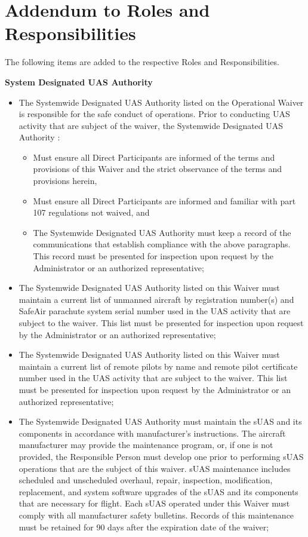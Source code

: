 \documentclass[
]{book}
\providecommand{\tightlist}{%
  \setlength{\itemsep}{0pt}\setlength{\parskip}{0pt}}
\begin{document}
\section{Addendum to Roles and Responsibilities}\label{s39p-rr}

The following items are added to the respective Roles and Responsibilities.

\textbf{System Designated UAS Authority}

\begin{itemize}
\item
  The Systemwide Designated UAS Authority listed on the Operational Waiver is responsible for the safe conduct of operations. Prior to conducting UAS activity that are subject of the waiver, the Systemwide Designated UAS Authority :

  \begin{itemize}
  \tightlist
  \item
    Must ensure all Direct Participants are informed of the terms and provisions of this Waiver and the strict observance of the terms and provisions herein,
  \item
    Must ensure all Direct Participants are informed and familiar with part 107 regulations not waived, and
  \item
    The Systemwide Designated UAS Authority must keep a record of the communications that establish compliance with the above paragraphs. This record must be presented for inspection upon request by the Administrator or an authorized representative;
  \end{itemize}
\item
  The Systemwide Designated UAS Authority listed on this Waiver must maintain a current list of unmanned aircraft by registration number(s) and SafeAir parachute system serial number used in the UAS activity that are subject to the waiver. This list must be presented for inspection upon request by the Administrator or an authorized representative;
\item
  The Systemwide Designated UAS Authority listed on this Waiver must maintain a current list of remote pilots by name and remote pilot certificate number used in the UAS activity that are subject to the waiver. This list must be presented for inspection upon request by the Administrator or an authorized representative;
\item
  The Systemwide Designated UAS Authority must maintain the sUAS and its components in accordance with manufacturer's instructions. The aircraft manufacturer may provide the maintenance program, or, if one is not provided, the Responsible Person must develop one prior to performing sUAS operations that are the subject of this waiver. sUAS maintenance includes scheduled and unscheduled overhaul, repair, inspection, modification, replacement, and system software upgrades of the sUAS and its components that are necessary for flight. Each sUAS operated under this Waiver must comply with all manufacturer safety bulletins. Records of this maintenance must be retained for 90 days after the expiration date of the waiver;

\end{itemize}
\end{document}
